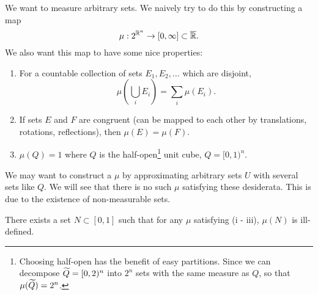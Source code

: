 \documentclass[12pt]{article} %
\begin{document}
We want to measure arbitrary sets. We naively try to do this by constructing a map \[\mu : 2^{\mathbb{R}^n} \to [0, \infty] \subset \overline{\mathbb{R}}.\] We also want this map to have some nice properties: \begin{enumerate}
    \item For a countable collection of sets $E_1, E_2, \ldots$ which are disjoint, \[\mu\left( \bigcup_{i}E_i \right) = \sum_i \mu(E_i).\]
    \item If sets $E$ and $F$ are congruent (can be mapped to each other by translations, rotations, reflections), then $\mu(E) = \mu(F)$.
    \item $\mu(Q) = 1$ where $Q$ is the half-open\footnote{Choosing half-open has the benefit of easy partitions. Since we can decompose $\widetilde{Q} = [0,2)^n$ into $2^n$ sets with the same measure as $Q$, so that $\mu(\widetilde{Q}) = 2^n$.} unit cube, $Q = [0, 1)^n$.
\end{enumerate}

\noindent We may want to construct a $\mu$ by approximating arbitrary sets $U$ with several sets like $Q$. We will see that there is no such $\mu$ satisfying these desiderata. This is due to the existence of non-measurable sets.

\begin{lemma}
    There exists a set $N \subset [0,1]$ such that for any $\mu$ satisfying (i - iii), $\mu(N)$ is ill-defined.
\end{lemma}
\end{document}
